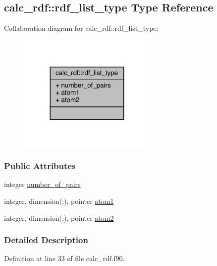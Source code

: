 \hypertarget{structcalc__rdf_1_1rdf__list__type}{\subsection{calc\-\_\-rdf\-:\-:rdf\-\_\-list\-\_\-type Type Reference}
\label{structcalc__rdf_1_1rdf__list__type}
}


Collaboration diagram for calc\-\_\-rdf\-:\-:rdf\-\_\-list\-\_\-type\-:
\nopagebreak
\begin{figure}[H]
\begin{center}
\leavevmode
\includegraphics[width=191pt]{structcalc__rdf_1_1rdf__list__type__coll__graph}
\end{center}
\end{figure}
\subsubsection*{Public Attributes}
\begin{DoxyCompactItemize}
\item 
integer \hyperlink{structcalc__rdf_1_1rdf__list__type_a3c971d538222b3d12c9dd44cb533d1d1}{number\-\_\-of\-\_\-pairs}
\item 
integer, dimension(\-:), pointer \hyperlink{structcalc__rdf_1_1rdf__list__type_abac5b081ad034e2b0c4a8dcf97970660}{atom1}
\item 
integer, dimension(\-:), pointer \hyperlink{structcalc__rdf_1_1rdf__list__type_ae32f73fe1e1d07410a01158985cfee14}{atom2}
\end{DoxyCompactItemize}


\subsubsection{Detailed Description}


Definition at line 33 of file calc\-\_\-rdf.\-f90.



